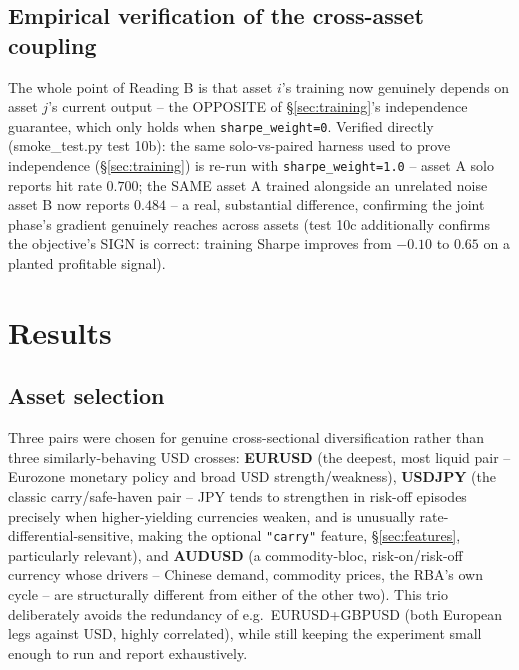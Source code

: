\documentclass[11pt]{article}
\newcommand{\code}[1]{\texttt{\small #1}}
\begin{document}
\subsection{Empirical verification of the cross-asset coupling}
\label{sec:verification}

The whole point of Reading B is that asset $i$'s training now genuinely depends on asset
$j$'s current output -- the OPPOSITE of \S\ref{sec:training}'s independence guarantee, which
only holds when \code{sharpe\_weight=0}. Verified directly (smoke\_test.py test 10b): the
same solo-vs-paired harness used to prove independence (\S\ref{sec:training}) is re-run with
\code{sharpe\_weight=1.0} -- asset A solo reports hit rate $0.700$; the SAME asset A trained
alongside an unrelated noise asset B now reports $0.484$ -- a real, substantial difference,
confirming the joint phase's gradient genuinely reaches across assets (test 10c additionally
confirms the objective's SIGN is correct: training Sharpe improves from $-0.10$ to $0.65$ on
a planted profitable signal).

\section{Results}
\label{sec:results}

\subsection{Asset selection}

Three pairs were chosen for genuine cross-sectional diversification rather than three
similarly-behaving USD crosses: \textbf{EURUSD} (the deepest, most liquid pair -- Eurozone
monetary policy and broad USD strength/weakness), \textbf{USDJPY} (the classic
carry/safe-haven pair -- JPY tends to strengthen in risk-off episodes precisely when
higher-yielding currencies weaken, and is unusually rate-differential-sensitive, making the
optional \code{"carry"} feature, \S\ref{sec:features}, particularly relevant), and
\textbf{AUDUSD} (a commodity-bloc, risk-on/risk-off currency whose drivers -- Chinese demand,
commodity prices, the RBA's own cycle -- are structurally different from either of the
other two). This trio deliberately avoids the redundancy of e.g.\ EURUSD+GBPUSD (both
European legs against USD, highly correlated), while still keeping the experiment small
enough to run and report exhaustively.
\end{document}
